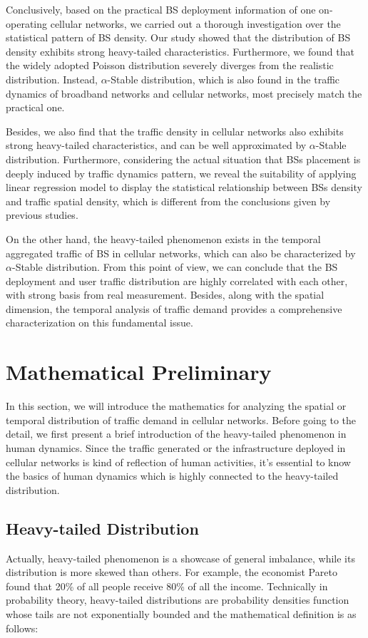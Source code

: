 Conclusively, based on the practical BS deployment information of one on-operating cellular networks, we carried out a thorough investigation over the statistical pattern of BS density. Our study showed that the distribution of BS density exhibits strong heavy-tailed characteristics. Furthermore, we found that the widely adopted Poisson distribution severely diverges from the realistic distribution. Instead, $\alpha$-Stable distribution, which is also found in the traffic dynamics of broadband networks and cellular networks, most precisely match the practical one.

Besides, we also find that the traffic density in cellular networks also exhibits strong heavy-tailed characteristics, and can be well approximated by $\alpha$-Stable distribution. Furthermore, considering the actual situation that BSs placement is deeply induced by traffic dynamics pattern, we reveal the suitability of applying linear regression model to display the statistical relationship between BSs density and traffic spatial density, which is different from the conclusions given by previous studies.

On the other hand, the heavy-tailed phenomenon exists in the temporal aggregated traffic of BS in cellular networks, which can also be characterized by $\alpha$-Stable distribution. From this point of view, we can conclude that the BS deployment and user traffic distribution are highly correlated with each other, with strong basis from real measurement. Besides, along with the spatial dimension, the temporal analysis of traffic demand provides a comprehensive characterization on this fundamental issue.

\section{Mathematical Preliminary} \label{sec4-math}
In this section, we will introduce the mathematics for analyzing the spatial or temporal distribution of traffic demand in cellular networks. Before going to the detail, we first present a brief introduction of the heavy-tailed phenomenon in human dynamics. Since the traffic generated or the infrastructure deployed in cellular networks is kind of reflection of human activities, it's essential to know the basics of human dynamics which is highly connected to the heavy-tailed distribution.
\subsection{Heavy-tailed Distribution}
Actually, heavy-tailed phenomenon is a showcase of general imbalance, while its distribution is more skewed than others. For example, the economist Pareto found that 20\% of all people receive 80\% of all the income. Technically in probability theory, heavy-tailed distributions are probability densities function whose tails are not exponentially bounded and the mathematical definition is as follows:


